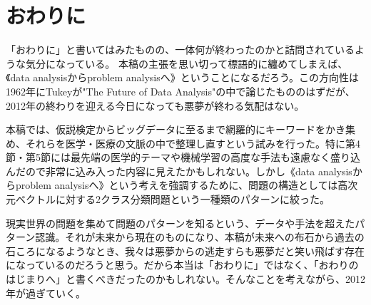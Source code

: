 \section{おわりに}
「おわりに」と書いてはみたものの、一体何が終わったのかと詰問されているような気分になっている。
本稿の主張を思い切って標語的に纏めてしまえば、《data analysisからproblem analysisへ》ということになるだろう。この方向性は1962年にTukeyが"The Future of Data Analysis"の中で論じたもののはずだが、2012年の終わりを迎える今日になっても悪夢が終わる気配はない。

本稿では、仮説検定からビッグデータに至るまで網羅的にキーワードをかき集め、それらを医学・医療の文脈の中で整理し直すという試みを行った。特に第4節・第5節には最先端の医学的テーマや機械学習の高度な手法も遠慮なく盛り込んだので非常に込み入った内容に見えたかもしれない。しかし《data analysisからproblem analysisへ》という考えを強調するために、問題の構造としては高次元ベクトルに対する2クラス分類問題という一種類のパターンに絞った。

現実世界の問題を集めて問題のパターンを知るという、データや手法を超えたパターン認識。それが未来から現在のものになり、本稿が未来への布石から過去の石ころになるようなとき、我々は悪夢からの逃走すらも悪夢だと笑い飛ばす存在になっているのだろうと思う。だから本当は「おわりに」ではなく、「おわりのはじまりへ」と書くべきだったのかもしれない。そんなことを考えながら、2012年が過ぎていく。




